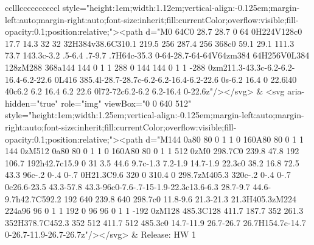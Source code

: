 \documentclass[
]{article}
\begin{document}
\begin{figure*}
\begin{longtable*}{cclllccccccccccl}
style="height:1em;width:1.12em;vertical-align:-0.125em;margin-left:auto;margin-right:auto;font-size:inherit;fill:currentColor;overflow:visible;fill-opacity:0.1;position:relative;"><path d="M0 64C0 28.7 28.7 0 64 0H224V128c0 17.7 14.3 32 32 32H384v38.6C310.1 219.5 256 287.4 256 368c0 59.1 29.1 111.3 73.7 143.3c-3.2 .5-6.4 .7-9.7 .7H64c-35.3 0-64-28.7-64-64V64zm384 64H256V0L384 128zM288 368a144 144 0 1 1 288 0 144 144 0 1 1 -288 0zm211.3-43.3c-6.2-6.2-16.4-6.2-22.6 0L416 385.4l-28.7-28.7c-6.2-6.2-16.4-6.2-22.6 0s-6.2 16.4 0 22.6l40 40c6.2 6.2 16.4 6.2 22.6 0l72-72c6.2-6.2 6.2-16.4 0-22.6z"/></svg> & <svg aria-hidden="true" role="img" viewBox="0 0 640 512" style="height:1em;width:1.25em;vertical-align:-0.125em;margin-left:auto;margin-right:auto;font-size:inherit;fill:currentColor;overflow:visible;fill-opacity:0.1;position:relative;"><path d="M144 0a80 80 0 1 1 0 160A80 80 0 1 1 144 0zM512 0a80 80 0 1 1 0 160A80 80 0 1 1 512 0zM0 298.7C0 239.8 47.8 192 106.7 192h42.7c15.9 0 31 3.5 44.6 9.7c-1.3 7.2-1.9 14.7-1.9 22.3c0 38.2 16.8 72.5 43.3 96c-.2 0-.4 0-.7 0H21.3C9.6 320 0 310.4 0 298.7zM405.3 320c-.2 0-.4 0-.7 0c26.6-23.5 43.3-57.8 43.3-96c0-7.6-.7-15-1.9-22.3c13.6-6.3 28.7-9.7 44.6-9.7h42.7C592.2 192 640 239.8 640 298.7c0 11.8-9.6 21.3-21.3 21.3H405.3zM224 224a96 96 0 1 1 192 0 96 96 0 1 1 -192 0zM128 485.3C128 411.7 187.7 352 261.3 352H378.7C452.3 352 512 411.7 512 485.3c0 14.7-11.9 26.7-26.7 26.7H154.7c-14.7 0-26.7-11.9-26.7-26.7z"/></svg> & Release: HW 1 \\ 

\end{longtable*}
\end{figure*}
\end{document}
